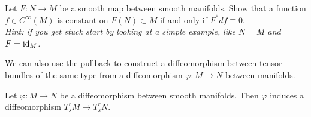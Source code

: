 \begin{exercise}
	Let $F:N\to M$ be a smooth map between smooth manifolds.
	Show that a function $f\in C^\infty(M)$ is constant on $F(N)\subset M$ if and only if $F^* df \equiv 0$.\\
	\textit{\small Hint: if you get stuck start by looking at a simple example, like $N=M$ and $F=\operatorname{id}_M$.}
\end{exercise}

We can also use the pullback to construct a diffeomorphism between tensor bundles of the same type from a diffeomorphism $\varphi:M\to N$ between manifolds.

\begin{proposition}
	Let $\varphi:M\to N$ be a diffeomorphism between smooth manifolds.
	Then $\varphi$ induces a diffeomorphism $T_s^rM \to T_s^r N$.
\end{proposition}
